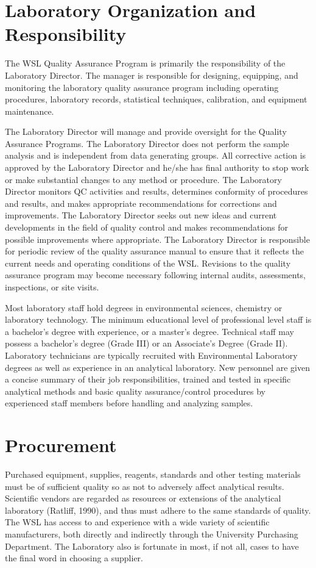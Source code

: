  

\section{Laboratory Organization and Responsibility}
The WSL Quality Assurance Program is primarily the 
responsibility of the Laboratory Director. The manager is responsible 
for designing, equipping, and monitoring the laboratory quality 
assurance program including operating procedures, laboratory records, 
statistical techniques, calibration, and equipment maintenance.

The Laboratory Director will manage and provide oversight for the 
Quality Assurance Programs. The Laboratory Director does not perform the 
sample analysis and is independent from data generating groups. All 
corrective action is approved by the Laboratory Director and he/she has 
final authority to stop work or make substantial changes to any method 
or procedure. The Laboratory Director monitors QC activities and 
results, determines conformity of procedures and results, and makes 
appropriate recommendations for corrections and improvements. The 
Laboratory Director seeks out new ideas and current developments in the 
field of quality control and makes recommendations for possible 
improvements where appropriate. The Laboratory Director is responsible 
for periodic review of the quality assurance manual to ensure that it 
reflects the current needs and operating conditions of the WSL. 
Revisions to the quality assurance program may become necessary 
following internal audits, assessments, inspections, or site visits. 

Most laboratory staff hold degrees in environmental sciences, chemistry 
or laboratory technology. The minimum educational level of professional 
level staff is a bachelor's degree with experience, or a master's 
degree. Technical staff may possess a bachelor's degree (Grade III) or 
an Associate's Degree (Grade II). Laboratory technicians are typically 
recruited with Environmental Laboratory degrees as well as experience in 
an analytical laboratory. New personnel are given a concise summary of 
their job responsibilities, trained and tested in specific analytical 
methods and basic quality assurance/control procedures by experienced 
staff members before handling and analyzing samples. 



\section{Procurement}
Purchased equipment, supplies, reagents, standards and other 
testing materials must be of sufficient quality so as not to adversely 
affect analytical results. Scientific vendors are regarded as resources 
or extensions of the analytical laboratory (Ratliff, 1990), and thus 
must adhere to the same standards of quality. The WSL has access to and 
experience with a wide variety of scientific manufacturers, both 
directly and indirectly through the University Purchasing Department. 
The Laboratory also is fortunate in most, if not all, cases to have the 
final word in choosing a supplier. 

